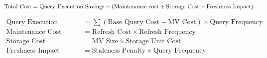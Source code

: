 \begin{equation}
\text{Total Cost} = \text{Query Execution Savings} - (\text{Maintenance cost} + \\\text{Storage Cost} + \text{Freshness Impact})
\end{equation}

\begin{align}
\text{Query Execution Savings} &= \sum (\text{Base Query Cost} - \text{MV Cost}) \times \text{Query Frequency} \\
\text{Maintenance Cost} &= \text{Refresh Cost} \times \text{Refresh Frequency} \\
\text{Storage Cost} &= \text{MV Size} \times \text{Storage Unit Cost} \\
\text{Freshness Impact} &= \text{Staleness Penalty} \times \text{Query Frequency}
\end{align}